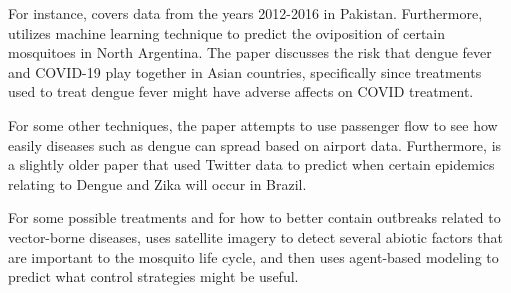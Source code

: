 \documentclass[11pt]{article}
\begin{document}
For instance, \parencite{deeplandscape} covers data from the years 2012-2016 in Pakistan. Furthermore, \parencite{ModelingDV} utilizes machine learning technique to predict the oviposition of certain mosquitoes in North Argentina.  The paper \parencite{doublepunch} discusses the risk that dengue fever and COVID-19 play together in Asian countries, specifically since treatments used to treat dengue fever might have adverse affects on COVID treatment. 

For some other techniques, the paper \parencite{dengue} attempts to use passenger flow to see how easily diseases such as dengue can spread based on airport data. Furthermore, \parencite{twitter} is a slightly older paper that used Twitter data to predict when certain epidemics relating to Dengue and Zika will occur in Brazil. 

For some possible treatments and for how to better contain outbreaks related to vector-borne diseases, \parencite{agent} uses satellite imagery to detect several abiotic factors that are important to the mosquito life cycle, and then uses agent-based modeling to predict what control strategies might be useful. 

\printbibliography
\end{document}
